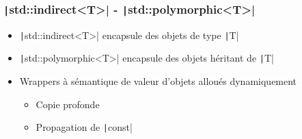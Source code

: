 \documentclass[C++.tex]{subfiles}
\begin{document}
\begin{frame}[fragile]
	\frametitle{\texttt|std::indirect<T>| - \texttt|std::polymorphic<T>|}
	\begin{itemize}
		\item \texttt|std::indirect<T>| encapsule des objets de type \texttt|T|
		\item \texttt|std::polymorphic<T>| encapsule des objets héritant de \texttt|T|
		\item Wrappers à sémantique de valeur d'objets alloués dynamiquement
		\begin{itemize}
			\item Copie profonde
			\item Propagation de \texttt|const|
		\end{itemize}
	\end{itemize}

\end{frame}
\end{document}
